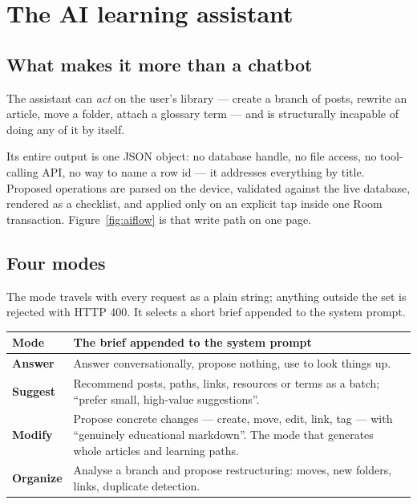 \section{The AI learning assistant}
\label{sec:ai}

\subsection{What makes it more than a chatbot}

The assistant can \emph{act} on the user's library --- create a branch of posts, rewrite an article, move a
folder, attach a glossary term --- and is structurally incapable of doing any of it by itself.

Its entire output is one JSON object: no database handle, no file access, no tool-calling API, no way to
name a row id --- it addresses everything by title. Proposed operations are parsed on the device, validated
against the live database, rendered as a checklist, and applied only on an explicit tap inside one Room
transaction. Figure~\ref{fig:aiflow} is that write path on one page.



\subsection{Four modes}

The mode travels with every request as a plain string; anything outside the set is rejected with HTTP 400.
It selects a short brief appended to the system prompt.

\noindent
\begin{tabularx}{\linewidth}{L{2.2cm} X}
\toprule
\textbf{Mode} & \textbf{The brief appended to the system prompt} \\
\midrule
\textbf{Answer} &
Answer conversationally, propose nothing, use  to look things up. \\
\addlinespace
\textbf{Suggest} &
Recommend posts, paths, links, resources or terms as a batch; ``prefer small, high-value suggestions''. \\
\addlinespace
\textbf{Modify} &
Propose concrete changes --- create, move, edit, link, tag --- with ``genuinely educational markdown''.
The mode that generates whole articles and learning paths. \\
\addlinespace
\textbf{Organize} &
Analyse a branch and propose restructuring: moves, new folders, links, duplicate detection. \\
\bottomrule
\end{tabularx}

